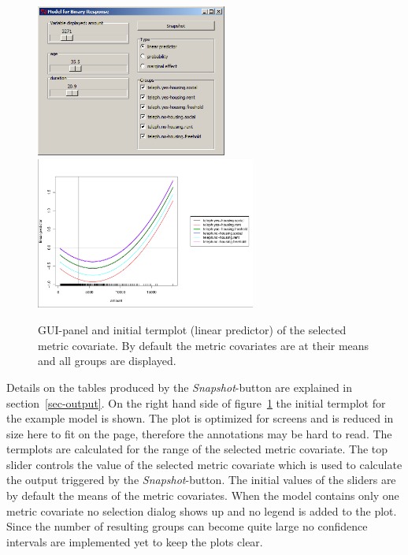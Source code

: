 \documentclass[nojss]{jss}
\begin{document}
\begin{enumerate}[leftmargin=1cm, rightmargin=0.5cm, label={\arabic{enumi}.}]
\begin{figure}[ht]
\centering
\includegraphics[height=5cm, width=6.26cm]{fig-002-1}   \quad \includegraphics[height=5cm, width=7.233cm]{fig-002-2.pdf}
\caption{GUI-panel and initial termplot (linear predictor) of the selected metric covariate. By default the metric covariates are at their means and all groups are displayed.} \label{fig-002}
\end{figure}
\end{enumerate}

Details on the tables produced by the \textit{Snapshot}-button are explained in section~\ref{sec-output}.
On the right hand side of figure~\ref{fig-002} the initial termplot for the example model is shown.  The plot is optimized for screens and is reduced in size here to fit on the page, therefore the annotations may be hard to read. The termplots are calculated for the range of the selected metric covariate. The top slider controls the value of the selected metric covariate which is used to calculate the output triggered by the \emph{Snapshot}-button. The initial values of the sliders are by default the means of the metric covariates. When the model contains only one metric covariate no selection dialog shows up and no legend is added to the plot. Since the number of resulting groups can become quite large no confidence intervals are implemented yet to keep the plots clear. 
\end{document}
